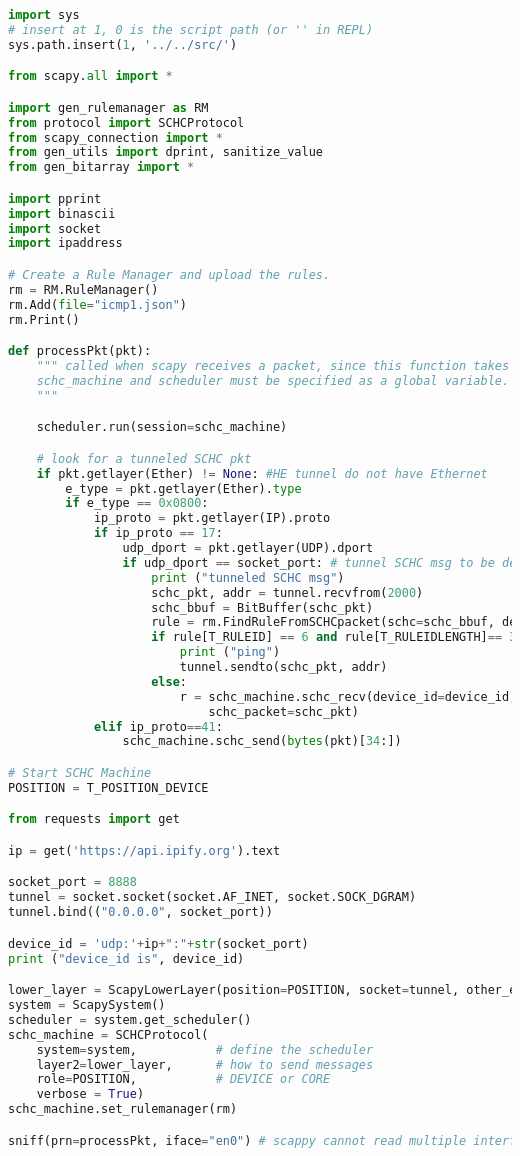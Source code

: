 \documentclass[onecolumn,12pt]{book}
\newcounter{c}
\begin{document}
\begin{lstlisting}[language=Python, caption={Program ping\_device2.py}, label=prog-ping-device2, basicstyle=\ttfamily\scriptsize]
import sys
# insert at 1, 0 is the script path (or '' in REPL)
sys.path.insert(1, '../../src/')

from scapy.all import *

import gen_rulemanager as RM
from protocol import SCHCProtocol
from scapy_connection import *
from gen_utils import dprint, sanitize_value
from gen_bitarray import *

import pprint
import binascii
import socket
import ipaddress

# Create a Rule Manager and upload the rules.
rm = RM.RuleManager()
rm.Add(file="icmp1.json")
rm.Print()

def processPkt(pkt):
    """ called when scapy receives a packet, since this function takes only one argument,
    schc_machine and scheduler must be specified as a global variable.
    """

    scheduler.run(session=schc_machine)

    # look for a tunneled SCHC pkt
    if pkt.getlayer(Ether) != None: #HE tunnel do not have Ethernet
        e_type = pkt.getlayer(Ether).type
        if e_type == 0x0800:
            ip_proto = pkt.getlayer(IP).proto
            if ip_proto == 17:
                udp_dport = pkt.getlayer(UDP).dport
                if udp_dport == socket_port: # tunnel SCHC msg to be decompressed
                    print ("tunneled SCHC msg")                    
                    schc_pkt, addr = tunnel.recvfrom(2000)
                    schc_bbuf = BitBuffer(schc_pkt)
                    rule = rm.FindRuleFromSCHCpacket(schc=schc_bbuf, device=device_id)
                    if rule[T_RULEID] == 6 and rule[T_RULEIDLENGTH]== 3:
                        print ("ping")
                        tunnel.sendto(schc_pkt, addr)
                    else: 
                        r = schc_machine.schc_recv(device_id=device_id, 
                            schc_packet=schc_pkt)
            elif ip_proto==41:
                schc_machine.schc_send(bytes(pkt)[34:])

# Start SCHC Machine
POSITION = T_POSITION_DEVICE

from requests import get

ip = get('https://api.ipify.org').text

socket_port = 8888
tunnel = socket.socket(socket.AF_INET, socket.SOCK_DGRAM)
tunnel.bind(("0.0.0.0", socket_port))

device_id = 'udp:'+ip+":"+str(socket_port)
print ("device_id is", device_id)

lower_layer = ScapyLowerLayer(position=POSITION, socket=tunnel, other_end=None)
system = ScapySystem()
scheduler = system.get_scheduler()
schc_machine = SCHCProtocol(
    system=system,           # define the scheduler
    layer2=lower_layer,      # how to send messages
    role=POSITION,           # DEVICE or CORE
    verbose = True)         
schc_machine.set_rulemanager(rm)

sniff(prn=processPkt, iface="en0") # scappy cannot read multiple interfaces

\end{lstlisting}
\end{document}
